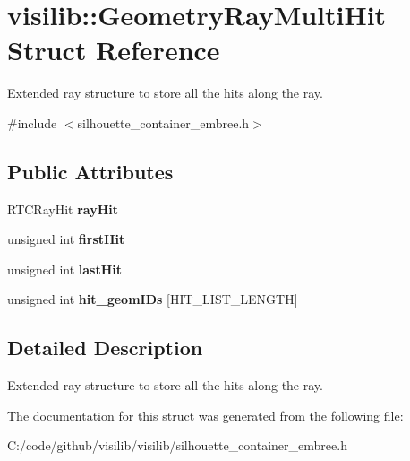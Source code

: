 \hypertarget{structvisilib_1_1_geometry_ray_multi_hit}{}\section{visilib\+::Geometry\+Ray\+Multi\+Hit Struct Reference}
\label{structvisilib_1_1_geometry_ray_multi_hit}


Extended ray structure to store all the hits along the ray. 




{\ttfamily \#include $<$silhouette\+\_\+container\+\_\+embree.\+h$>$}

\subsection*{Public Attributes}
\begin{DoxyCompactItemize}
\item 
\mbox{\label{structvisilib_1_1_geometry_ray_multi_hit_afae4c896c73b645bd216321622f6a92b}} 
R\+T\+C\+Ray\+Hit {\bfseries ray\+Hit}
\item 
\mbox{\label{structvisilib_1_1_geometry_ray_multi_hit_ad5d5b5118b46c96eecb5a53270ff351d}} 
unsigned int {\bfseries first\+Hit}
\item 
\mbox{\label{structvisilib_1_1_geometry_ray_multi_hit_abb8d1627292c4e26f86eb376cb931fdd}} 
unsigned int {\bfseries last\+Hit}
\item 
\mbox{\label{structvisilib_1_1_geometry_ray_multi_hit_a56b29113dfe810532eaf05f71aae5b09}} 
unsigned int {\bfseries hit\+\_\+geom\+I\+Ds} \mbox{[}H\+I\+T\+\_\+\+L\+I\+S\+T\+\_\+\+L\+E\+N\+G\+TH\mbox{]}
\end{DoxyCompactItemize}


\subsection{Detailed Description}
Extended ray structure to store all the hits along the ray. 

The documentation for this struct was generated from the following file\+:\begin{DoxyCompactItemize}
\item 
C\+:/code/github/visilib/visilib/silhouette\+\_\+container\+\_\+embree.\+h\end{DoxyCompactItemize}
